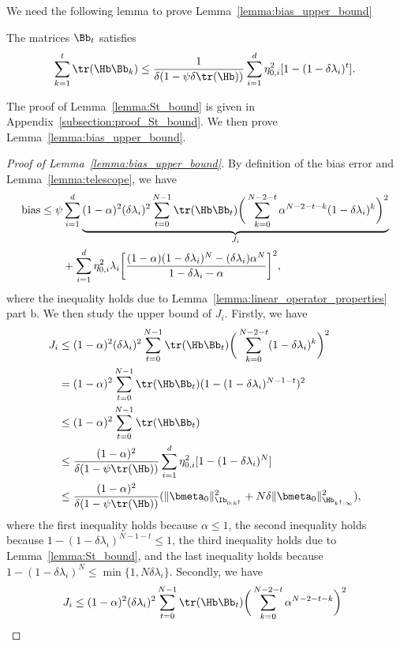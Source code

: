 \documentclass[11pt]{article}
\begin{document}
We need the following lemma to prove Lemma~\ref{lemma:bias_upper_bound}
\begin{lemma}\label{lemma:St_bound}
The matrices $\Bb_t$ satisfies
\begin{align*}
\sum_{k=1}^t\tr(\Hb\Bb_k)\le\frac{1}{\delta(1-\psi\delta\tr(\Hb))}\sum_{i=1}^d\eta_{0, i}^2[1-(1-\delta\lambda_i)^t].
\end{align*}
\end{lemma}
The proof of Lemma~\ref{lemma:St_bound} is given in Appendix~\ref{subsection:proof_St_bound}. We then prove Lemma~\ref{lemma:bias_upper_bound}.
\begin{proof}[Proof of Lemma~\ref{lemma:bias_upper_bound}]
By definition of the bias error and Lemma~\ref{lemma:telescope}, we have
\begin{align*}
\mathrm{bias}&\le\psi\sum_{i=1}^d\underbrace{(1-\alpha)^2(\delta\lambda_i)^2\sum_{t=0}^{N-1}\tr(\Hb\Bb_t)\bigg(\sum_{k=0}^{N-2-t}\alpha^{N-2-t-k}(1-\delta\lambda_i)^k\bigg)^2}_{J_i}\\
&\qquad+\sum_{i=1}^d\eta_{0, i}^2\lambda_i\bigg[\frac{(1-\alpha)(1-\delta\lambda_i)^N-(\delta\lambda_i)\alpha^N}{1-\delta\lambda_i-\alpha}\bigg]^2,
\end{align*}
where the inequality holds due to Lemma~\ref{lemma:linear_operator_properties} part b. We then study the upper bound of $J_i$. Firstly, we have
\begin{align*}
J_i&\le(1-\alpha)^2(\delta\lambda_i)^2\sum_{t=0}^{N-1}\tr(\Hb\Bb_t)\bigg(\sum_{k=0}^{N-2-t}(1-\delta\lambda_i)^k\bigg)^2\\
&=(1-\alpha)^2\sum_{t=0}^{N-1}\tr(\Hb\Bb_t)(1-(1-\delta\lambda_i)^{N-1-t})^2\\
&\le(1-\alpha)^2\sum_{t=0}^{N-1}\tr(\Hb\Bb_t)\\
&\le\frac{(1-\alpha)^2}{\delta(1-\psi\tr(\Hb))}\sum_{i=1}^d\eta_{0, i}^2[1-(1-\delta\lambda_i)^N]\\
&\le\frac{(1-\alpha)^2}{\delta(1-\psi\tr(\Hb))}(\|\bmeta_0\|_{\Ib_{0:k^\dagger}}^2+N\delta\|\bmeta_0\|_{\Hb_{k^\dagger:\infty}}^2),
\end{align*}
where the first inequality holds because $\alpha\le1$, the second inequality holds because $1-(1-\delta\lambda_i)^{N-1-t}\le1$, the third inequality holds due to Lemma~\ref{lemma:St_bound}, and the last inequality holds because $1-(1-\delta\lambda_i)^N\le\min\{1, N\delta\lambda_i\}$.
Secondly, we have
\begin{align*}
J_i&\le(1-\alpha)^2(\delta\lambda_i)^2\sum_{t=0}^{N-1}\tr(\Hb\Bb_t)\bigg(\sum_{k=0}^{N-2-t}\alpha^{N-2-t-k}\bigg)^2\\

\end{align*}
\end{proof}
\end{document}
